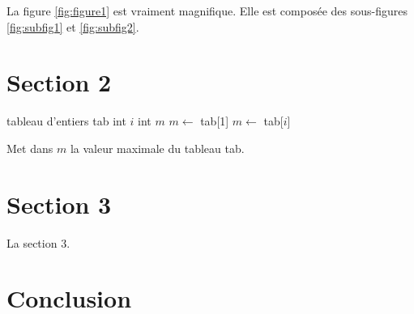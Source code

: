 La figure \ref{fig:figure1} est vraiment magnifique. Elle est composée des sous-figures \ref{fig:subfig1} et \ref{fig:subfig2}.

\section{Section 2}

\begin{algorithm}
  \begin{algorithmic}
    \STATE tableau d'entiers tab 
    \STATE int $i$ 
    \STATE int $m$ 
    \STATE
    \STATE $m \leftarrow$ tab[1]
        \STATE $m \leftarrow$ tab[$i$]
      \ENDIF
    \ENDFOR
  \end{algorithmic}
  \caption[Algorithme 1]{Met dans $m$ la valeur maximale du tableau tab.}
\end{algorithm}

\section{Section 3}

La section 3.

\section{Conclusion}
